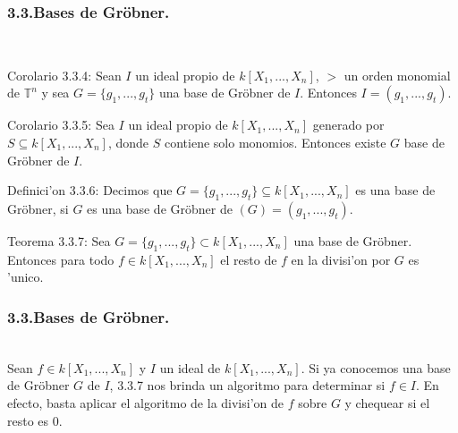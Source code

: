 \documentclass[10pt]{beamer}
\renewcommand{\T}{\mathbb{T}^n}
\begin{document}
\begin{frame}
\frametitle{3.3.Bases de Gr\"obner.}\\
\begin{block}{Corolario 3.3.4:}
Sean $I$ un ideal propio de $k[X_1,...,X_n]$, $>$ un orden monomial de $\T$ y sea $G=\{g_1,...,g_t\}$ una base de Gr\"obner de $I$. Entonces $I=(g_1,...,g_t)$.\\
\end{block}
\begin{block}{Corolario 3.3.5:}
Sea $I$ un ideal propio de $k[X_1,...,X_n]$ generado por $S\subseteq k[X_1,...,X_n]$, donde $S$ contiene  solo monomios. Entonces existe $G$ base de Gr\"obner de $I$.\\
\end{block}
\begin{block}{Definici'on 3.3.6:}
Decimos que $G=\{g_1,...,g_t\} \subseteq k[X_1,...,X_n]$ es una base de Gr\"obner, si $G$ es una base de Gr\"obner de $(G)=(g_1,...,g_t)$.\\
\end{block}
\begin{block}{Teorema 3.3.7:}
Sea $G=\{g_1,...,g_t\}\subset k[X_1,...,X_n]$ una base de Gr\"obner. Entonces para todo $f \in k[X_1,...,X_n]$ el resto de $f$ en la divisi'on por $G$ es 'unico.\\
\end{block}
\end{frame}





\begin{frame}
\frametitle{3.3.Bases de Gr\"obner.}\\
Sean $f \in k[X_1,...,X_n]$ y $I$ un ideal de $k[X_1,...,X_n]$. Si ya conocemos una base de Gr\"obner $G$ de $I$, 3.3.7 nos brinda un algoritmo para determinar si $f \in I$. En efecto, basta aplicar el algoritmo de la divisi'on de $f$ sobre $G$ y chequear si el resto es $0$.\\
\vspace{8cm}
\end{frame}
\end{document}
